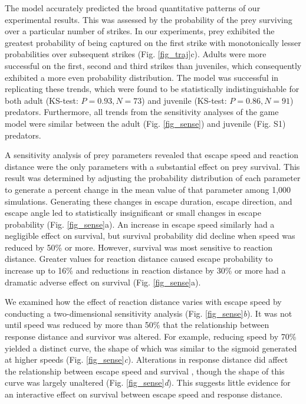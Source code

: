\documentclass[]{rsos}%
\begin{document}
The model accurately predicted the broad quantitative patterns of our experimental results.
This was assessed by the probability of the prey surviving over a particular number of strikes. 
In our experiments, prey exhibited the greatest probability of being captured on the first strike with monotonically lesser probabilities over subsequent strikes (Fig. \ref{fig_traj}c).
Adults were more successful on the first, second and third strikes than juveniles, which consequently exhibited a more even probability distribution.
The model was successful in replicating these trends, which were found to be statistically indistinguishable for both adult (KS-test: $P = 0.93, N = 73$) and juvenile (KS-test: $P = 0.86, N = 91$) predators. 
Furthermore, all trends from the sensitivity analyses of the game model were similar between the adult (Fig. \ref{fig_sense}) and juvenile (Fig. S1) predators. 

A sensitivity analysis of prey parameters revealed that escape speed and reaction distance were the only parameters with a substantial effect on prey survival. 
This result was determined by adjusting the probability distribution of each parameter to generate a percent change in the mean value of that parameter among 1,000 simulations.
Generating these changes in escape duration, escape direction, and escape angle led to statistically insignificant or small changes in escape probability (Fig. \ref{fig_sense}a). 
An increase in escape speed similarly had a negligible effect on survival, but survival probability did decline when speed was reduced by 50\% or more.
However, survival was most sensitive to reaction distance.
Greater values for reaction distance caused escape probability to increase up to 16\% and reductions in reaction distance by 30\% or more had a dramatic adverse effect on survival (Fig. \ref{fig_sense}a). 

We examined how the effect of reaction distance varies with escape speed by conducting a two-dimensional sensitivity analysis (Fig. \ref{fig_sense}\textit{b}).
It was not until speed was reduced by more than 50\% that the relationship between response distance and survivor was altered.
For example, reducing speed by 70\% yielded a distinct curve, the shape of which was similar to the sigmoid generated at higher speeds (Fig. \ref{fig_sense}\textit{c}). 
Alterations in response distance did affect the relationship between escape speed and survival , though the shape of this curve was largely unaltered (Fig. \ref{fig_sense}\textit{d}).
This suggests little evidence for an interactive effect on survival between escape speed and response distance.
\end{document}
